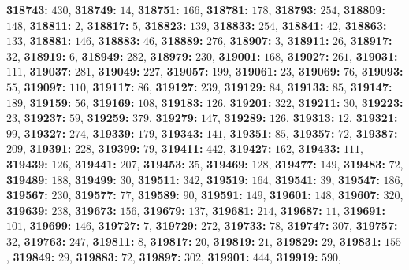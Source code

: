 \textsf{\bfseries 318743:} $430$, \textsf{\bfseries 318749:} $14$, \textsf{\bfseries 318751:} $166$, \textsf{\bfseries 318781:} $178$, \textsf{\bfseries 318793:} $254$, \textsf{\bfseries 318809:} $148$, \textsf{\bfseries 318811:} $2$, \textsf{\bfseries 318817:} $5$, \textsf{\bfseries 318823:} $139$, \textsf{\bfseries 318833:} $254$, \textsf{\bfseries 318841:} $42$, \textsf{\bfseries 318863:} $133$, \textsf{\bfseries 318881:} $146$, \textsf{\bfseries 318883:} $46$, \textsf{\bfseries 318889:} $276$, \textsf{\bfseries 318907:} $3$, \textsf{\bfseries 318911:} $26$, \textsf{\bfseries 318917:} $32$, \textsf{\bfseries 318919:} $6$, \textsf{\bfseries 318949:} $282$, \textsf{\bfseries 318979:} $230$, \textsf{\bfseries 319001:} $168$, \textsf{\bfseries 319027:} $261$, \textsf{\bfseries 319031:} $111$, \textsf{\bfseries 319037:} $281$, \textsf{\bfseries 319049:} $227$, \textsf{\bfseries 319057:} $199$, \textsf{\bfseries 319061:} $23$, \textsf{\bfseries 319069:} $76$, \textsf{\bfseries 319093:} $55$, \textsf{\bfseries 319097:} $110$, \textsf{\bfseries 319117:} $86$, \textsf{\bfseries 319127:} $239$, \textsf{\bfseries 319129:} $84$, \textsf{\bfseries 319133:} $85$, \textsf{\bfseries 319147:} $189$, \textsf{\bfseries 319159:} $56$, \textsf{\bfseries 319169:} $108$, \textsf{\bfseries 319183:} $126$, \textsf{\bfseries 319201:} $322$, \textsf{\bfseries 319211:} $30$, \textsf{\bfseries 319223:} $23$, \textsf{\bfseries 319237:} $59$, \textsf{\bfseries 319259:} $379$, \textsf{\bfseries 319279:} $147$, \textsf{\bfseries 319289:} $126$, \textsf{\bfseries 319313:} $12$, \textsf{\bfseries 319321:} $99$, \textsf{\bfseries 319327:} $274$, \textsf{\bfseries 319339:} $179$, \textsf{\bfseries 319343:} $141$, \textsf{\bfseries 319351:} $85$, \textsf{\bfseries 319357:} $72$, \textsf{\bfseries 319387:} $209$, \textsf{\bfseries 319391:} $228$, \textsf{\bfseries 319399:} $79$, \textsf{\bfseries 319411:} $442$, \textsf{\bfseries 319427:} $162$, \textsf{\bfseries 319433:} $111$, \textsf{\bfseries 319439:} $126$, \textsf{\bfseries 319441:} $207$, \textsf{\bfseries 319453:} $35$, \textsf{\bfseries 319469:} $128$, \textsf{\bfseries 319477:} $149$, \textsf{\bfseries 319483:} $72$, \textsf{\bfseries 319489:} $188$, \textsf{\bfseries 319499:} $30$, \textsf{\bfseries 319511:} $342$, \textsf{\bfseries 319519:} $164$, \textsf{\bfseries 319541:} $39$, \textsf{\bfseries 319547:} $186$, \textsf{\bfseries 319567:} $230$, \textsf{\bfseries 319577:} $77$, \textsf{\bfseries 319589:} $90$, \textsf{\bfseries 319591:} $149$, \textsf{\bfseries 319601:} $148$, \textsf{\bfseries 319607:} $320$, \textsf{\bfseries 319639:} $238$, \textsf{\bfseries 319673:} $156$, \textsf{\bfseries 319679:} $137$, \textsf{\bfseries 319681:} $214$, \textsf{\bfseries 319687:} $11$, \textsf{\bfseries 319691:} $101$, \textsf{\bfseries 319699:} $146$, \textsf{\bfseries 319727:} $7$, \textsf{\bfseries 319729:} $272$, \textsf{\bfseries 319733:} $78$, \textsf{\bfseries 319747:} $307$, \textsf{\bfseries 319757:} $32$, \textsf{\bfseries 319763:} $247$, \textsf{\bfseries 319811:} $8$, \textsf{\bfseries 319817:} $20$, \textsf{\bfseries 319819:} $21$, \textsf{\bfseries 319829:} $29$, \textsf{\bfseries 319831:} $155$, \textsf{\bfseries 319849:} $29$, \textsf{\bfseries 319883:} $72$, \textsf{\bfseries 319897:} $302$, \textsf{\bfseries 319901:} $444$, \textsf{\bfseries 319919:} $590$, 
